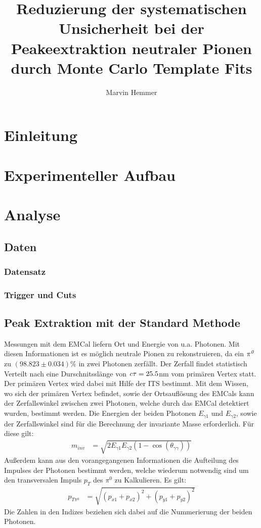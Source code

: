\documentclass[]{article}
\title{Reduzierung der systematischen Unsicherheit bei der Peakeextraktion neutraler Pionen durch Monte Carlo Template Fits}
\author{Marvin Hemmer}
\begin{document}
\maketitle
\newpage
\tableofcontents
\newpage

	\section{Einleitung}

	\section{Experimenteller Aufbau}

	\section{Analyse}
	\subsection{Daten}
	\subsubsection{Datensatz}
	\subsubsection{Trigger und Cuts}
	\subsection{Peak Extraktion mit der Standard Methode}
	Messungen mit dem EMCal liefern Ort und Energie von u.a. Photonen. Mit diesen Informationen ist es m{\"o}glich neutrale Pionen zu rekonstruieren, da ein ${\it \pi^{0}}$ zu $\left( 98.823\pm0.034\right)\%$ in zwei Photonen zerf{\"a}llt. Der Zerfall findet statistisch Verteilt nach eine Durschnitssl{\"a}nge von ${\it c\tau} = 25.5$nm vom prim{\"a}ren Vertex statt. Der prim{\"a}ren Vertex wird dabei mit Hilfe der ITS bestimmt.
	Mit dem Wissen, wo sich der prim{\"a}ren Vertex befindet, sowie der Ortsaufl{\"o}sung des EMCals kann der Zerfallswinkel zwischen zwei Photonen, welche durch das EMCal detektiert wurden, bestimmt werden.
	Die Energien der beiden Photonen $E_{\gamma1}$ und $E_{\gamma2}$, sowie der Zerfallswinkel sind f{\"u}r die Berechnung der invariante Masse erforderlich. F{\"u}r diese gilt:
	\begin{align}
	\label{eq_invmass}
	m_{inv} &= \sqrt{2E_{\gamma1}E_{\gamma2}(1-\cos\left( \theta_{\gamma\gamma}\right) )} 
	\end{align}
	Au{\ss}erdem kann aus den vorangegangenen Informationen die Aufteilung des Impulses der Photonen bestimmt werden, welche wiederum notwendig sind um den transversalen Impuls $p_{T}$ des $\pi^{0}$ zu Kalkulieren.
	Es gilt:
	\begin{align}
	\label{eq_pt}
	p_{T\pi^{0}} &= \sqrt{\left(p_{x1}+p_{x2}\right)^{2} +\left(p_{y1}+p_{y2}\right)^{2}} 
	\end{align}
	Die Zahlen in den Indizes beziehen sich dabei auf die Nummerierung der beiden Photonen.
	
\end{document}

